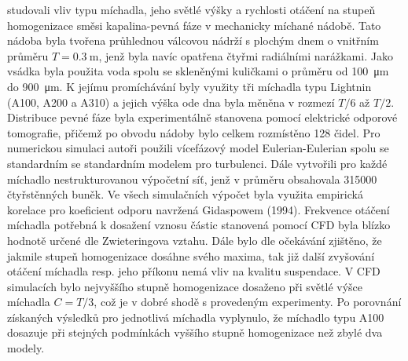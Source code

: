 \citet{hos10} studovali vliv typu míchadla, jeho světlé výšky a rychlosti otáčení na stupeň homogenizace směsi kapalina-pevná fáze v mechanicky míchané nádobě. Tato nádoba byla tvořena průhlednou válcovou nádrží s plochým dnem o vnitřním průměru $T=\SI{0.3}{\meter}$, jenž byla navíc opatřena čtyřmi radiálními narážkami. Jako vsádka byla použita voda spolu se skleněnými kuličkami o průměru od \SI{100}{\micro\meter} do \SI{900}{\micro\meter}. K jejímu promíchávání byly využity tři míchadla typu Lightnin (A100, A200 a A310) a jejich výška ode dna byla měněna v rozmezí $T/6$ až $T/2$. Distribuce pevné fáze byla experimentálně stanovena pomocí elektrické odporové tomografie, přičemž po obvodu nádoby bylo celkem rozmístěno \num{128} čidel. Pro numerickou simulaci autoři použili vícefázový model Eulerian-Eulerian spolu se standardním se standardním \keps{} modelem pro turbulenci. Dále vytvořili pro každé míchadlo nestrukturovanou výpočetní síť, jenž v průměru obsahovala \num{315000} čtyřstěnných buněk. Ve všech simulačních výpočet byla využita empirická korelace pro koeficient odporu navržená Gidaspowem (1994). Frekvence otáčení míchadla potřebná k dosažení vznosu částic stanovená pomocí CFD byla blízko hodnotě určené dle Zwieteringova vztahu. Dále bylo dle očekávání  zjištěno, že jakmile stupeň homogenizace dosáhne svého maxima, tak již další zvyšování otáčení míchadla resp. jeho příkonu nemá vliv na kvalitu suspendace. V CFD simulacích bylo nejvyššího stupně homogenizace dosaženo při světlé výšce míchadla $C=T/3$, což je v dobré shodě s provedeným experimenty. Po porovnání získaných výsledků pro jednotlivá míchadla vyplynulo, že míchadlo typu A100 dosazuje při stejných podmínkách vyššího stupně homogenizace než zbylé dva modely.    
